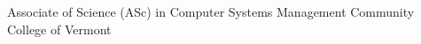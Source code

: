 \cventry{}
{Associate of Science (ASc) in Computer Systems Management}
{Community College of Vermont}
{} %
{}{}
